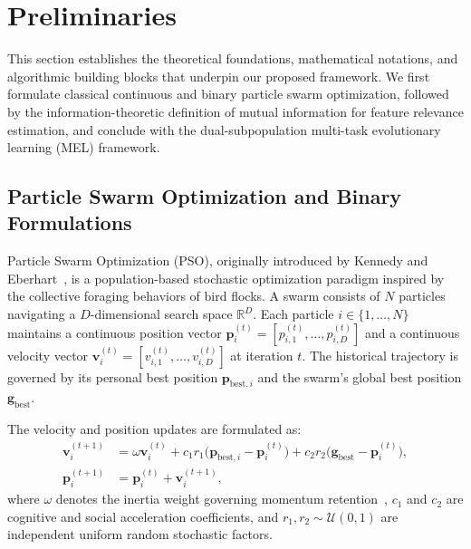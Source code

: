 \section{Preliminaries}\label{sec:preliminaries}

This section establishes the theoretical foundations, mathematical notations, and algorithmic building blocks that underpin our proposed framework. We first formulate classical continuous and binary particle swarm optimization, followed by the information-theoretic definition of mutual information for feature relevance estimation, and conclude with the dual-subpopulation multi-task evolutionary learning (MEL) framework.

\subsection{Particle Swarm Optimization and Binary Formulations}\label{sec:pso}

Particle Swarm Optimization (PSO), originally introduced by Kennedy and Eberhart~\cite{kennedy1995}, is a population-based stochastic optimization paradigm inspired by the collective foraging behaviors of bird flocks. A swarm consists of $N$ particles navigating a $D$-dimensional search space $\mathbb{R}^D$. Each particle $i \in \{1, \ldots, N\}$ maintains a continuous position vector $\mathbf{p}_i^{(t)} = [p_{i,1}^{(t)}, \ldots, p_{i,D}^{(t)}]$ and a continuous velocity vector $\mathbf{v}_i^{(t)} = [v_{i,1}^{(t)}, \ldots, v_{i,D}^{(t)}]$ at iteration $t$. The historical trajectory is governed by its personal best position $\mathbf{p}_{\mathrm{best},i}$ and the swarm's global best position $\mathbf{g}_{\mathrm{best}}$.

The velocity and position updates are formulated as:
\begin{align}
\mathbf{v}_i^{(t+1)} &= \omega \mathbf{v}_i^{(t)} + c_1 r_1 \bigl(\mathbf{p}_{\mathrm{best},i} - \mathbf{p}_i^{(t)}\bigr) + c_2 r_2 \bigl(\mathbf{g}_{\mathrm{best}} - \mathbf{p}_i^{(t)}\bigr), \label{eq:pso_velocity} \\
\mathbf{p}_i^{(t+1)} &= \mathbf{p}_i^{(t)} + \mathbf{v}_i^{(t+1)}, \label{eq:pso_position}
\end{align}
where $\omega$ denotes the inertia weight governing momentum retention~\cite{shi1998}, $c_1$ and $c_2$ are cognitive and social acceleration coefficients, and $r_1, r_2 \sim \mathcal{U}(0, 1)$ are independent uniform random stochastic factors.

